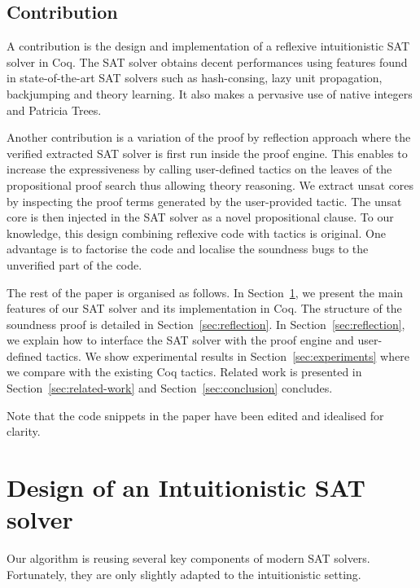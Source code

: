 \documentclass[utf8,a4paper,UKenglish,cleveref, autoref, thm-restate]{lipics-v2019}
\begin{document}
\subsection{Contribution}

A contribution is the design and implementation of a reflexive
intuitionistic SAT solver in Coq.  The SAT solver obtains decent
performances using features found in state-of-the-art SAT solvers such
as hash-consing, lazy unit propagation, backjumping and theory
learning. It also makes a pervasive use of native integers and
Patricia Trees.


Another contribution is a variation of the proof by reflection
approach where the verified extracted SAT solver is first run inside
the proof engine. This enables to increase the expressiveness by
calling user-defined tactics on the leaves of the propositional proof
search thus allowing theory reasoning.
%
We extract unsat cores by inspecting the proof terms generated by the
user-provided tactic. The unsat core is then injected in the SAT
solver as a novel propositional clause. To our knowledge, this design
combining reflexive code with tactics is original. One advantage is to
factorise the code and localise the soundness bugs to the unverified
part of the code.

The rest of the paper is organised as follows.
%
In Section~\ref{sec:design}, we present the main features of our SAT
solver and its implementation in Coq.
%
The structure of the soundness proof is detailed in Section~\ref{sec:reflection}.
%
In Section~\ref{sec:reflection}, we explain how to interface the SAT
solver with the proof engine and  user-defined
tactics.
%
We show experimental results in Section~\ref{sec:experiments} where we
compare with the existing Coq tactics.
%
Related work is presented in Section~\ref{sec:related-work} and
Section~\ref{sec:conclusion} concludes.

Note that the code snippets in the paper have been edited and
idealised for clarity. 

\section{Design of an Intuitionistic SAT solver}
\label{sec:design}

Our algorithm is reusing several key components of modern SAT
solvers. Fortunately, they are only slightly adapted to the
intuitionistic setting.
\end{document}
